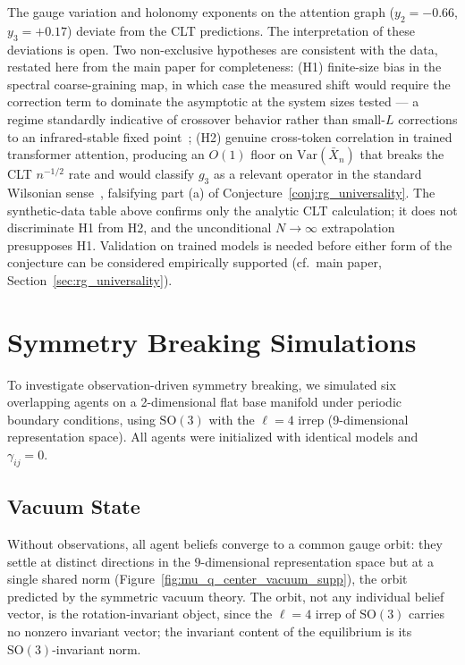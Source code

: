 \documentclass[twoside,11pt]{article}
\begin{document}
The gauge variation and holonomy exponents on the attention graph ($y_2 = -0.66$, $y_3 = +0.17$) deviate from the CLT predictions. The interpretation of these deviations is open. Two non-exclusive hypotheses are consistent with the data, restated here from the main paper for completeness: (H1) finite-size bias in the spectral coarse-graining map, in which case the measured shift would require the correction term to dominate the asymptotic at the system sizes tested --- a regime standardly indicative of crossover behavior rather than small-$L$ corrections to an infrared-stable fixed point~\citep{Cardy1996}; (H2) genuine cross-token correlation in trained transformer attention, producing an $O(1)$ floor on $\mathrm{Var}(\bar{X}_n)$ that breaks the CLT $n^{-1/2}$ rate and would classify $g_3$ as a relevant operator in the standard Wilsonian sense~\citep{Cardy1996,goldenfeld1992lectures}, falsifying part (a) of Conjecture~\ref{conj:rg_universality}. The synthetic-data table above confirms only the analytic CLT calculation; it does not discriminate H1 from H2, and the unconditional $N\to\infty$ extrapolation presupposes H1. Validation on trained models is needed before either form of the conjecture can be considered empirically supported (cf.\ main paper, Section~\ref{sec:rg_universality}).


\section{Symmetry Breaking Simulations}
\label{app:symmetry_breaking_sims_supp}

To investigate observation-driven symmetry breaking, we simulated six overlapping agents on a 2-dimensional flat base manifold under periodic boundary conditions, using $\mathrm{SO}(3)$ with the $\ell = 4$ irrep (9-dimensional representation space). All agents were initialized with identical models and $\gamma_{ij} = 0$.

\subsection{Vacuum State}
Without observations, all agent beliefs converge to a common gauge orbit: they settle at distinct directions in the $9$-dimensional representation space but at a single shared norm (Figure~\ref{fig:mu_q_center_vacuum_supp}), the orbit predicted by the symmetric vacuum theory. The orbit, not any individual belief vector, is the rotation-invariant object, since the $\ell = 4$ irrep of $\mathrm{SO}(3)$ carries no nonzero invariant vector; the invariant content of the equilibrium is its $\mathrm{SO}(3)$-invariant norm.
\end{document}

